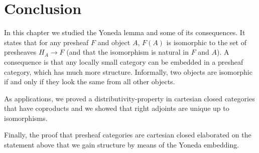 \documentclass{article}
\theoremstyle{definition}
\numberwithin{equation}{section}
\begin{document}
\section{Conclusion}
In this chapter we studied the Yoneda lemma and some of its consequences. It states that for any presheaf $F$ and object $A$, $F(A)$ is isomorphic to the set of presheaves $H_A\to F$ (and that the isomorphism is natural in $F$ and $A$). A consequence is that any locally small category can be embedded in a presheaf category, which has much more structure. Informally, two objects are isomorphic if and only if they look the same from all other objects.

As applications, we proved a distributivity-property in cartesian closed categories that have copro\-ducts and we showed that right adjoints are unique up to isomorphisms.

Finally, the proof that presheaf categories are cartesian closed elaborated on the statement above that we gain structure by means of the Yoneda embedding.
\end{document}

